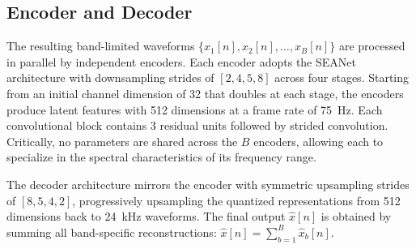 \documentclass[11pt]{article}
\begin{document}
\subsection{Encoder and Decoder}







The resulting band-limited waveforms $\{x_1[n], x_2[n], \dots, x_B[n]\}$ are processed in parallel by independent encoders. Each encoder adopts the SEANet~\cite{tagliasacchi2020seanet} architecture with downsampling strides of $[2, 4, 5, 8]$ across four stages. Starting from an initial channel dimension of 32 that doubles at each stage, the encoders produce latent features with 512 dimensions at a frame rate of 75~Hz. Each convolutional block contains 3 residual units followed by strided convolution. Critically, no parameters are shared across the $B$ encoders, allowing each to specialize in the spectral characteristics of its frequency range.

The decoder architecture mirrors the encoder with symmetric upsampling strides of $[8, 5, 4, 2]$, progressively upsampling the quantized representations from 512 dimensions back to 24~kHz waveforms. The final output $\hat{x}[n]$ is obtained by summing all band-specific reconstructions: $\hat{x}[n] = \sum_{b=1}^{B} \hat{x}_b[n]$.
\end{document}
